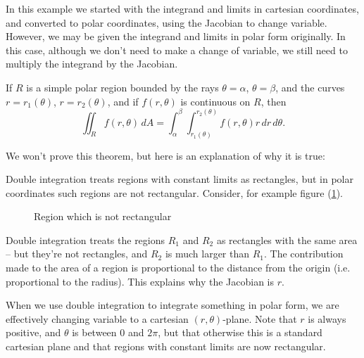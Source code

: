   In this example we started with the integrand and limits in cartesian coordinates, and converted to polar coordinates, using the Jacobian to change variable.  However, we may be given the integrand and limits in polar form originally.  In this case, although we don't need to make a change of variable, we still need to multiply the integrand by the Jacobian.

  \begin{theorem}
    If $R$ is a simple polar region bounded by the rays $\theta = \alpha$, $\theta = \beta$, and the curves $r = r_1(\theta)$, $r = r_2(\theta)$, and if $f(r, \theta)$ is continuous on $R$, then
      \[
        \iint_R f(r,\theta) \, dA = \int_{\alpha}^{\beta} \int_{r_1(\theta)}^{r_2(\theta)} f(r, \theta) r \, dr \, d\theta.
      \]
  \end{theorem}

  We won't prove this theorem, but here is an explanation of why it is true:

  Double integration treats regions with constant limits as rectangles, but in polar coordinates such regions are not rectangular.  Consider, for example figure (\ref{notrectangles}).
  
  \begin{figure}[H]
    \centering
    \def\svgwidth{0.55\columnwidth}
    
    \caption{Region which is not rectangular}
    \label{notrectangles}
  \end{figure}
  
  Double integration treats the regions $R_1$ and $R_2$ as rectangles with the same area -- but they're not rectangles, and $R_2$ is much larger than $R_1$.  The contribution made to the area of a region is proportional to the distance from the origin (i.e. proportional to the radius).  This explains why the Jacobian is $r$.
  
  When we use double integration to integrate something in polar form, we are effectively changing variable to a cartesian $(r, \theta)$-plane.  Note that $r$ is always positive, and $\theta$ is between $0$ and $2\pi$, but that otherwise this is a standard cartesian plane and that regions with constant limits are now rectangular.


